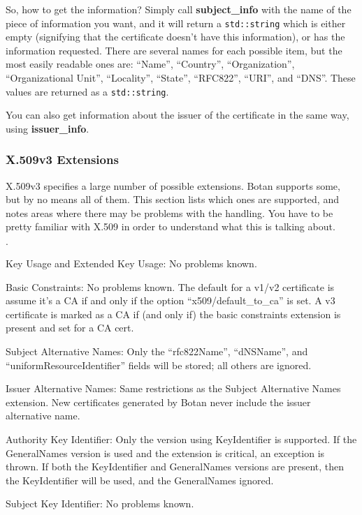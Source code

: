 \documentclass{article}
\newcommand{\function}[1]{\textbf{#1}}
\newcommand{\type}[1]{\texttt{#1}}
\begin{document}
So, how to get the information? Simply call \function{subject\_info} with the
name of the piece of information you want, and it will return a
\type{std::string} which is either empty (signifying that the certificate
doesn't have this information), or has the information requested. There are
several names for each possible item, but the most easily readable ones are:
``Name'', ``Country'', ``Organization'', ``Organizational Unit'', ``Locality'',
``State'', ``RFC822'', ``URI'', and ``DNS''. These values are returned as a
\type{std::string}.

You can also get information about the issuer of the certificate in the same
way, using \function{issuer\_info}.

\subsubsection{X.509v3 Extensions}

X.509v3 specifies a large number of possible extensions. Botan supports some,
but by no means all of them. This section lists which ones are supported, and
notes areas where there may be problems with the handling. You have to be
pretty familiar with X.509 in order to understand what this is talking about.

\begin{list}{$\cdot$}
  \item Key Usage and Extended Key Usage: No problems known.
  \item

  \item Basic Constraints: No problems known. The default for a v1/v2
        certificate is assume it's a CA if and only if the option
        ``x509/default\_to\_ca'' is set. A v3 certificate is marked as a CA if
        (and only if) the basic constraints extension is present and set for a
        CA cert.

  \item Subject Alternative Names: Only the ``rfc822Name'', ``dNSName'', and
        ``uniformResourceIdentifier'' fields will be stored; all others are
        ignored.

  \item Issuer Alternative Names: Same restrictions as the Subject Alternative
        Names extension. New certificates generated by Botan never include the
        issuer alternative name.

  \item Authority Key Identifier: Only the version using KeyIdentifier is
        supported. If the GeneralNames version is used and the extension is
        critical, an exception is thrown. If both the KeyIdentifier and
        GeneralNames versions are present, then the KeyIdentifier will be
        used, and the GeneralNames ignored.

  \item Subject Key Identifier: No problems known.
\end{list}
\end{document}
